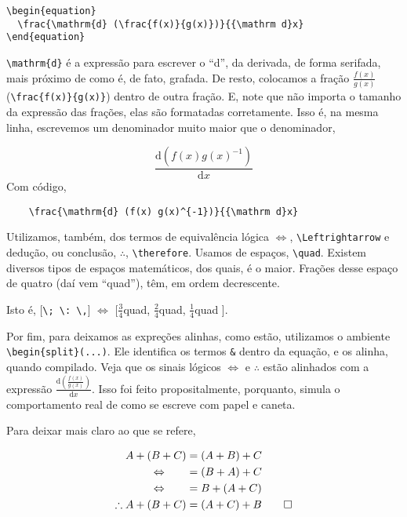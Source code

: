 \documentclass[12pt,
brazilian,
a5paper]{abntex2} %
\begin{document}
\begin{verbatim}
\begin{equation}
  \frac{\mathrm{d} (\frac{f(x)}{g(x)})}{{\mathrm d}x}
\end{equation}
\end{verbatim}

  \verb+\mathrm{d}+ é a expressão para escrever o ``d'', da derivada, de
  forma serifada, mais próximo de como é, de fato, grafada. De resto,
  colocamos a fração $\frac{f(x)}{g(x)}$ (\verb+\frac{f(x)}{g(x)}+)
  dentro de outra fração. E, note que não importa o tamanho da expressão
  das frações, elas são formatadas corretamente. Isso é, na mesma linha,
  escrevemos um denominador muito maior que o denominador,

  \begin{equation}
    \frac{\mathrm{d} (f(x) g(x)^{-1})}{{\mathrm d}x}
  \end{equation}
  Com código,
\begin{verbatim}
    \frac{\mathrm{d} (f(x) g(x)^{-1})}{{\mathrm d}x}
\end{verbatim}

  Utilizamos, também, dos termos de equivalência lógica
  $\Leftrightarrow$, \verb+\Leftrightarrow+ e dedução, ou conclusão,
  $\therefore$, \verb+\therefore+. Usamos de espaços,
  \verb+\quad+. Existem diversos tipos de espaços matemáticos, dos
  quais, \quad é o maior. Frações desse espaço de quatro (daí vem
  ``quad''), têm, em ordem decrescente.

  \vspace{3mm}

  Isto é, [\verb+\; \: \,+] $\Leftrightarrow$ [$\frac{3}{4}$quad,
  $\frac{2}{4}$quad,  $\frac{1}{4}$quad ].

  \vspace{3mm}

  Por fim, para deixamos as expreções alinhas, como estão, utilizamos o
  ambiente \verb+\begin{split}(...)+. Ele identifica os termos \verb+&+ dentro
    da equação, e os alinha, quando compilado. Veja que os sinais
    lógicos $\Leftrightarrow$ e $\therefore$ estão alinhados com a
    expressão $\frac{\mathrm{d} (\frac{f(x)}{g(x)})}{{\mathrm
        d}x}$. Isso foi feito propositalmente, porquanto, simula o
    comportamento real de como se escreve com papel e caneta.

    Para deixar mais claro ao que se refere,

    \begin{equation}
      \begin{split}
        A + (B + C) &= (A + B) + C\\ %
        \Leftrightarrow \qquad  & = (B + A) + C \\ %
        \Leftrightarrow  \qquad & =  B + (A + C)\\ %
        \therefore A + (B + C) & = (A + C) + B\qed \\ %
      \end{split}
    \end{equation}
\end{document}
